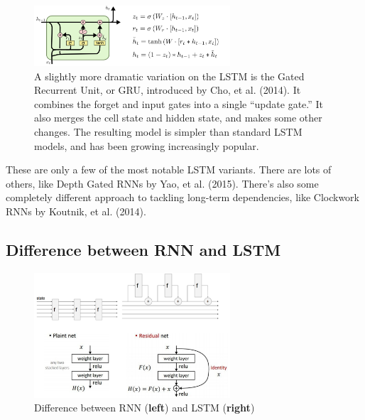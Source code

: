 \documentclass{article}
\begin{document}
	\begin{figure}[h]
		\centering
		\includegraphics[width=0.65\textwidth]{Images/recurrent_neural_networks/27.png}
		\caption{A slightly more dramatic variation on the LSTM is the Gated Recurrent Unit, or GRU, introduced by Cho, et al. (2014). It combines the forget and input gates into a single ``update gate.” It also merges the cell state and hidden state, and makes some other changes. The resulting model is simpler than standard LSTM models, and has been growing increasingly popular.}
	\end{figure}
	
	These are only a few of the most notable LSTM variants. There are lots of others, like Depth Gated RNNs by Yao, et al. (2015). There’s also some completely different approach to tackling long-term dependencies, like Clockwork RNNs by Koutnik, et al. (2014).
	
	\subsection{Difference between RNN and LSTM}
	\begin{figure}[!htb]
		\centering
		\includegraphics[width=0.65\textwidth]{Images/recurrent_neural_networks/19.png}
		\caption{Difference between RNN (\textbf{left}) and LSTM (\textbf{right})}
	\end{figure}
	
\end{document}
